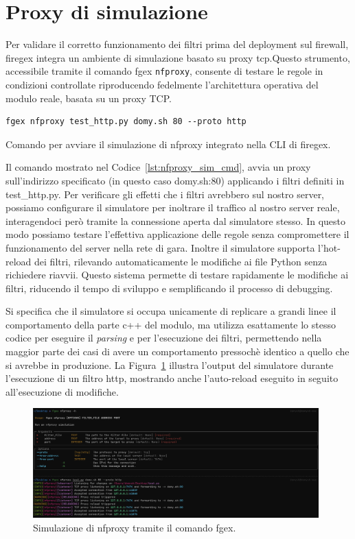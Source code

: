 \section{Proxy di simulazione}

Per validare il corretto funzionamento dei filtri prima del deployment sul firewall, firegex integra un ambiente di simulazione basato su proxy \gls{tcp}.\@ Questo strumento, accessibile tramite il comando fgex \texttt{\gls{nfproxy}}, consente di testare le regole in condizioni controllate riproducendo fedelmente l'architettura operativa del modulo reale, basata su un proxy TCP.
\begin{listing}[H]
\begin{verbatim}
fgex nfproxy test_http.py domy.sh 80 --proto http
\end{verbatim}
\vspace{-1em}
\caption{Comando per avviare il simulazione di nfproxy integrato nella CLI di firegex.}\label{lst:nfproxy_sim_cmd}
\end{listing}

Il comando mostrato nel Codice~\ref{lst:nfproxy_sim_cmd}, avvia un proxy sull'indirizzo specificato (in questo caso domy.sh:80) applicando i filtri definiti in test\_http.py.
Per verificare gli effetti che i filtri avrebbero sul nostro server, possiamo configurare il simulatore per inoltrare il traffico al nostro server reale, interagendoci però tramite la connessione aperta dal simulatore stesso. In questo modo possiamo testare l'effettiva applicazione delle regole senza compromettere il funzionamento del server nella rete di gara.
Inoltre il simulatore supporta l'hot-reload dei filtri, rilevando automaticamente le modifiche ai file Python senza richiedere riavvii. Questo sistema permette di testare rapidamente le modifiche ai filtri, riducendo il tempo di sviluppo e semplificando il processo di debugging.

Si specifica che il simulatore si occupa unicamente di replicare a grandi linee il comportamento della parte c++ del modulo, ma utilizza esattamente lo stesso codice per eseguire il \textit{parsing} e per l'esecuzione dei filtri, permettendo nella maggior parte dei casi di avere un comportamento pressochè identico a quello che si avrebbe in produzione.
La Figura~\ref{fig:nfproxy_sim} illustra l'output del simulatore durante l'esecuzione di un filtro \gls{http}, mostrando anche l'auto-reload eseguito in seguito all'esecuzione di modifiche.

\begin{figure}[H]
    \centering
    \includegraphics[width=0.98\textwidth]{images/chapter3/nfproxy_sim.png}
    \caption{Simulazione di nfproxy tramite il comando fgex.}\label{fig:nfproxy_sim}
\end{figure}
